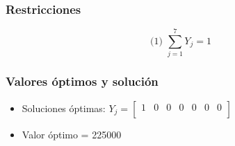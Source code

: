 \documentclass[a4paper,12pt]{article}
\begin{document}
\subsubsection{Restricciones}
\begin{equation*}
	\text{(1) }\sum_{j=1}^{7}Y_j=1
\end{equation*}
\subsubsection{Valores óptimos y solución}
\begin{itemize}
	\item Soluciones óptimas:
	$Y_{j}=
	\begin{bmatrix}
	1 & 0 & 0 & 0 & 0 & 0 & 0\\
	\end{bmatrix}$
	\item Valor óptimo = 225000
\end{itemize}
\end{document}
